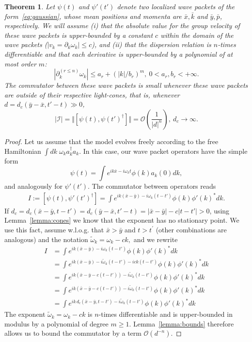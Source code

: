 \documentclass[notitlepage, prx, preprint, amsmath,superscriptaddress,amssymb]{revtex4-1}
\newtheorem{theorem}{Theorem}[section]
\begin{document}
\begin{theorem}
\label{th:free-causality}
Let $\psi(t)$ and $\psi'(t')$ denote two localized wave packets of the form\ \eqref{eq:gaussian}, whose mean positions and momenta are $\bar x,\bar k$ and $\bar y,\bar p$, respectively. We will assume (i) that the  absolute value for the group velocity of these wave packets is upper-bounded by a constant $c$ within the domain of the wave packets ($\vert  v_k = \partial_k \omega_k \vert  \leq c$), and (ii) that the dispersion relation is $n$-times differentiable and that each derivative is upper-bounded by a polynomial of at most order $m$:
\begin{equation}
|\partial^{(r\leq n)}_k\omega_k|\leq a_r + (|k|/b_r)^m,~0< a_r,b_r<+\infty.
\end{equation}
The commutator between these wave packets is small whenever these wave packets are outside of their respective light-cones, that is, whenever $d=d_c(\bar y-\bar x,t'-t)\gg 0$, 
\begin{equation}
|\mathcal{I}|=\Vert[\psi(t),\psi(t')^\dagger]\Vert =
\mathcal{O}\left(\frac{1}{|d|^n}\right),~d_c\to\infty.
\end{equation}
\end{theorem}

\begin{proof}
Let us assume that the model evolves freely according to the free Hamiltonian
$\int d k \; \omega_k a_k^\dagger a_k$.
In this case, our wave packet operators have the simple form
\begin{equation}
\psi(t) = \int  e^{ik\bar x-i\omega_kt} \phi(k) a_k(0) dk,
\end{equation}
and analogously for $\psi'(t')$. The commutator between operators reads
\begin{align}
I:=[\psi(t),\psi'(t')^\dagger] =
\int e^{ik(\bar x-\bar y)-i\omega_k(t-t')} \phi(k)\phi'(k)^*dk.
\label{eq:free-com}
\end{align}
If $d_c= d_c(\bar x-\bar y,t-t')  = d_c(\bar y-\bar x,t'-t) = |\bar x-\bar y| -c|t-t'|   > 0$, using Lemma\ \ref{lemma:cones} we know that the exponent has no stationary point. We use this fact, assume w.l.o.g.  that $\bar x>\bar y$ and $t>t^\prime$ (other combinations are analogous) and the notation  $\tilde\omega_k = \omega_k -c k,$ and we rewrite
\begin{align*}
I&= \int  e^{ik(\bar x-\bar y)-i\omega_k(t-t')}  \phi(k)\phi'(k)^*dk\\
&= \int  e^{ik(\bar x-\bar y)-i\tilde\omega_k(t-t') - ick(t-t')}  \phi(k)\phi'(k)^*dk\\
&= \int  e^{ik(\bar x-\bar y-c(t-t'))-i\tilde\omega_k(t-t')}  \phi(k)\phi'(k)^*dk\\
&= \int  e^{ik(\bar x-\bar y-c(t-t'))-i\tilde\omega_k(t-t')}  \phi(k)\phi'(k)^*dk\\
&=\int e^{ik\,  d_c(\bar x-\bar y, t-t')-i\tilde\omega_k(t-t')} \phi(k)\phi'(k)^*dk
\end{align*}
The exponent $\tilde\omega_k = \omega_k -c k$ is $n$-times differentiable and is upper-bounded in modulus by a polynomial of degree $m\geq 1$. Lemma\ \ref{lemma:bounds} therefore allows us to bound the commutator by a term $\mathcal{O}(d^{-n})$.
\end{proof}
\end{document}
